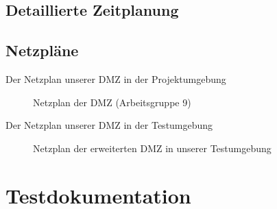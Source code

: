 

\clearpage

\subsection{Detaillierte Zeitplanung}
\label{app:Zeitplanung}
\clearpage



\clearpage

\subsection{Netzpläne}
\label{app:Netzplan}
Der Netzplan unserer \acs{DMZ} in der Projektumgebung
\begin{figure}[htb]
\centering
{}
\caption{Netzplan der DMZ (Arbeitsgruppe 9)}
\end{figure}

Der Netzplan unserer \acs{DMZ} in der Testumgebung
\begin{figure}[htb]
    \centering
    \caption{Netzplan der erweiterten DMZ in unserer Testumgebung}
\end{figure}
\clearpage

\section{Testdokumentation}
\label{app:Test}

